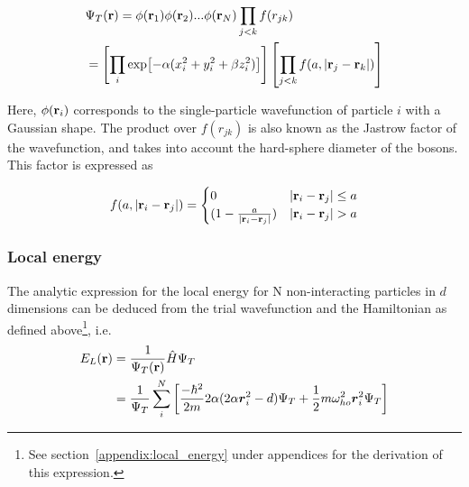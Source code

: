 \documentclass[
    a4paper, aps, twocolumn, floatfix, superscriptaddress,
    nofootinbib]{revtex4-1}
\begin{document}
\begin{align}
    &\Psi_T(\bold r) = \phi(\bold r_1)\phi(\bold r_2)...\phi(\bold r_N) \prod_{j<k}f(r_{jk}) \label{eq:trial_wavefunction_total}\\
    &= \left[\prod_i\exp[-\alpha(x_i^2 + y_i^2 + \beta z_i^2)]\right]\left[\prod_{j<k}f(a, |\bold r_j - \bold r_k|)\right]\nonumber
\end{align}

Here, $\phi(\bold r_i)$ corresponds to the single-particle wavefunction of particle $i$ with a Gaussian shape. The product over $f(r_{jk})$ is also known as the Jastrow factor of the wavefunction, and takes into account the hard-sphere diameter of the bosons. This factor is expressed as

\begin{align}
    f(a, |\bold r_i - \bold r_j|) = \begin{cases}
    0 & |\bold r_i - \bold r_j| \leq a \\
    (1-\frac{a}{|\bold r_i - \bold r_j|}) & |\bold r_i - \bold r_j| > a
    \end{cases}
\end{align}

\subsubsection{Local energy} 
The analytic expression for the local energy for N non-interacting particles in $d$ dimensions can be deduced from the trial wavefunction and the Hamiltonian as defined above\footnote{See section~\ref{appendix:local_energy} under appendices for the derivation of this expression.}, i.e.
\begin{align}
    E_L(\bold r) &= \frac{1}{\Psi_T(\bold r)}\hat{H}\Psi_T \label{eq:E_local_analytic}\\
    &= \frac{1}{\Psi_T} \sum_i^N \left[\frac{-\hbar^2}{2m} 2\alpha(2\alpha \boldsymbol{r}_i^2 - d) \Psi_T + \frac{1}{2}m \omega_{ho}^2 \boldsymbol{r}_i^2 \Psi_T\right] \nonumber
\end{align}
\end{document}

